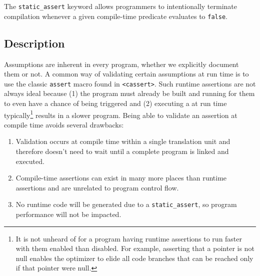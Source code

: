 
\setcounter{table}{0}
\setcounter{footnote}{0}
\setcounter{lstlisting}{0}


The \lstinline!static_assert! keyword allows programmers to intentionally terminate compilation whenever a given compile-time predicate
 evaluates to \lstinline!false!.

\subsection[Description]{Description}\label{description}

Assumptions are
inherent in every program, whether we explicitly document them or not. A common way of validating certain
assumptions at run time is to use the classic \lstinline!assert! macro found
in \lstinline!<cassert>!. Such runtime assertions are not always ideal
because (1) the program must already be built and running for them to
even have a chance of being triggered and (2) executing a
 at run time typically{\cprotect\footnote{It is
not unheard of for a program having runtime assertions to run faster with them
enabled than disabled. For example, asserting that a pointer is not
null enables the optimizer to elide all code branches that
  can be reached only if that pointer were null.}} results in a slower
program. Being able to validate an assertion at compile time avoids
several drawbacks:

\begin{enumerate}
\item{Validation occurs at compile time within a single translation unit and therefore doesn’t need to wait until a complete program is linked and executed.}
\item{Compile-time assertions can exist in many more places than runtime assertions and are unrelated to program control flow.}
\item{No runtime code will be generated due to a \lstinline!static_assert!, so program performance will not be impacted.}
\end{enumerate}

